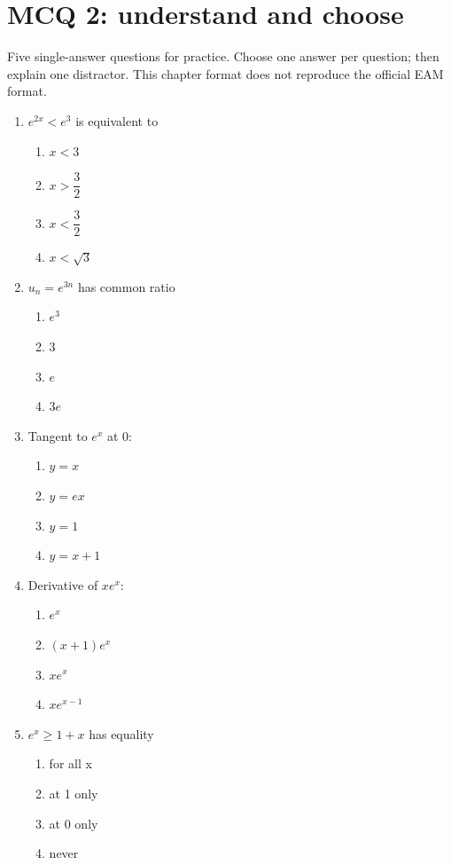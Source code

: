 \endgroup
\begingroup\small
{}\section*{MCQ 2: understand and choose}\label{C09-Q2}
Five single-answer questions for practice. Choose one answer per question; then explain one distractor. This chapter format does not reproduce the official EAM format.
\begin{enumerate}
\item $e^{2x}<e^3$ is equivalent to
\begin{enumerate}[label=\Alph*.,itemsep=2pt]
\item $x<3$
\item $x>\dfrac{3}{2}$
\item $x<\dfrac{3}{2}$
\item $x<\sqrt3$
\end{enumerate}
\item $u_n=e^{3n}$ has common ratio
\begin{enumerate}[label=\Alph*.,itemsep=2pt]
\item $e^3$
\item $3$
\item $e$
\item $3e$
\end{enumerate}
\item Tangent to $e^x$ at 0:
\begin{enumerate}[label=\Alph*.,itemsep=2pt]
\item $y=x$
\item $y=e x$
\item $y=1$
\item $y=x+1$
\end{enumerate}
\item Derivative of $xe^x$:
\begin{enumerate}[label=\Alph*.,itemsep=2pt]
\item $e^x$
\item $(x+1)e^x$
\item $xe^x$
\item $xe^{x-1}$
\end{enumerate}
\item $e^x\geq1+x$ has equality
\begin{enumerate}[label=\Alph*.,itemsep=2pt]
\item for all x
\item at 1 only
\item at 0 only
\item never
\end{enumerate}
\end{enumerate}
